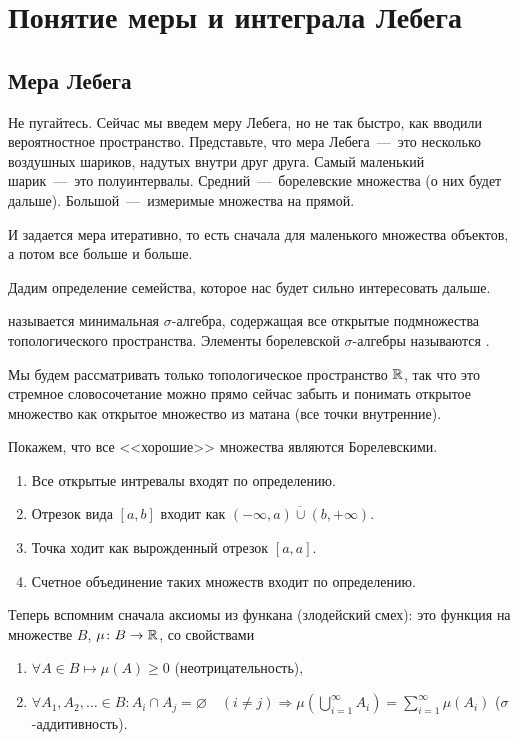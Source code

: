 \documentclass[../TV&MS.tex]{subfiles}
\begin{document}
\section{Понятие меры и интеграла Лебега}

\subsection{Мера Лебега}

\qquad Не пугайтесь. Сейчас мы введем меру Лебега, но не так быстро, как 
вводили вероятностное пространство. Представьте, что мера Лебега~---~это
несколько воздушных шариков, надутых внутри друг друга. Самый маленький 
шарик~---~это полуинтервалы. Средний~---~борелевские множества (о них будет
дальше). Большой~---~измеримые множества на прямой.

И задается мера итеративно, то есть сначала для маленького множества объектов,
а потом все больше и больше. 

Дадим определение семейства, которое нас будет сильно интересовать дальше.

\begin{Def}
 называется минимальная $\sigma$-алгебра, 
содержащая все открытые подмножества топологического пространства. Элементы 
борелевской $\sigma$-алгебры называются .
\end{Def}

\begin{Wtf}
Мы будем рассматривать только топологическое пространство $\mathbb{R}$, так что это стремное 
словосочетание можно прямо сейчас забыть и понимать открытое множество как открытое множество 
из матана (все точки внутренние).
\end{Wtf}

\begin{Ex}
Покажем, что все <<хорошие>> множества являются Борелевскими.
\begin{enumerate}
\item Все открытые интревалы входят по определению.
\item Отрезок вида $[a, b]$ входит как $\overline{(-\infty, a) \cup (b, +\infty)}$.
\item Точка ходит как вырожденный отрезок $[a, a]$.
\item Счетное объединение таких множеств входит по определению.
\end{enumerate}
\end{Ex}

\begin{Def}
Теперь вспомним сначала аксиомы  
из функана (злодейский смех): это функция на множестве 
$B$, $\mu \colon B \to \mathbb{R}$, со свойствами
\begin{enumerate}
	\item $\forall A \in B \mapsto \mu(A) \ge 0$ (неотрицательность),
	\item $\forall A_1, A_2, \ldots \in B \colon A_i\cap A_j = \varnothing 
	\quad (i \not= j) \Rightarrow \mu\left(\bigcup\limits_{i=1}^\infty A_i\right) =
	\sum\limits_{i=1}^\infty \mu(A_i)$ ($\sigma$-аддитивность).
\end{enumerate} 
\end{Def}
\end{document}
